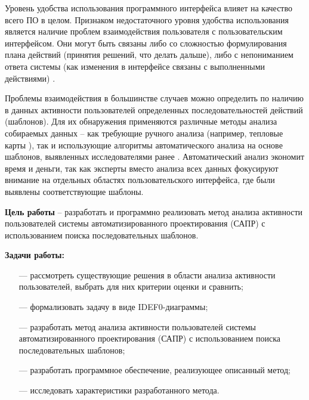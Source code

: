 
Уровень удобства использования программного интерфейса влияет на качество всего ПО в целом. Признаком недостаточного уровня удобства использования является наличие проблем взаимодействия пользователя с пользовательским интерфейсом. Они могут быть связаны либо со сложностью формулирования плана действий (принятия решений, что делать дальше), либо с непониманием ответа системы (как изменения в интерфейсе связаны с выполненными действиями) \cite{1}.

Проблемы взаимодействия в большинстве случаев можно определить по наличию в данных активности пользователей определенных последовательностей действий (шаблонов). Для их обнаружения применяются различные методы анализа собираемых данных – как требующие ручного анализа (например, тепловые карты \cite{2,3}), так и использующие алгоритмы автоматического анализа \cite{1} на основе шаблонов, выявленных исследователями ранее \cite{4, 5, 6}. Автоматический анализ экономит время и деньги, так как эксперты вместо анализа всех данных фокусируют внимание на отдельных областях пользовательского интерфейса,
где были выявлены соответствующие шаблоны.


\textbf{Цель работы} – разработать и программно реализовать метод анализа активности пользователей системы автоматизированного проектирования (САПР) с использованием поиска последовательных шаблонов.


\textbf{Задачи работы:}
\begin{itemize}
	\item[---] рассмотреть существующие решения в области анализа активности пользователей, выбрать для них критерии оценки и сравнить;
	\item[---] формализовать задачу в виде IDEF0-диаграммы;
	\item[---] разработать метод анализа активности пользователей системы автоматизированного проектирования (САПР) с использованием поиска последовательных шаблонов; %
	\item[---] разработать программное обеспечение, реализующее описанный метод;
	\item[---] исследовать характеристики разработанного метода.
\end{itemize}
